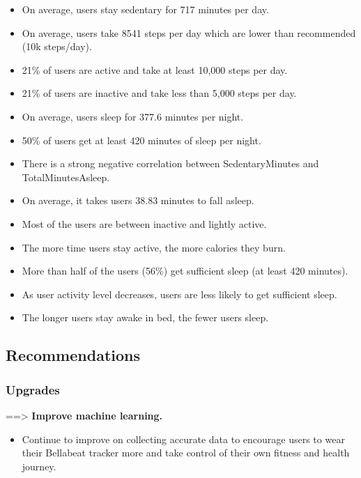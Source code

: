 \documentclass[
]{article}
\providecommand{\tightlist}{%
  \setlength{\itemsep}{0pt}\setlength{\parskip}{0pt}}
\begin{document}
\begin{itemize}
\tightlist
\item
  On average, users stay sedentary for 717 minutes per day.
\item
  On average, users take 8541 steps per day which are lower than
  recommended (10k steps/day).
\item
  21\% of users are active and take at least 10,000 steps per day.
\item
  21\% of users are inactive and take less than 5,000 steps per day.
\item
  On average, users sleep for 377.6 minutes per night.
\item
  50\% of users get at least 420 minutes of sleep per night.
\item
  There is a strong negative correlation between SedentaryMinutes and
  TotalMinutesAsleep.
\item
  On average, it takes users 38.83 minutes to fall asleep.
\item
  Most of the users are between inactive and lightly active.
\item
  The more time users stay active, the more calories they burn.
\item
  More than half of the users (56\%) get sufficient sleep (at least 420
  minutes).
\item
  As user activity level decreases, users are less likely to get
  sufficient sleep.
\item
  The longer users stay awake in bed, the fewer users sleep.
\end{itemize}

\hypertarget{recommendations}{%
\subsection{Recommendations}\label{recommendations}}

\hypertarget{upgrades}{%
\subsubsection{Upgrades}\label{upgrades}}

==\textgreater{} \textbf{Improve machine learning.}

\begin{itemize}
\tightlist
\item
  Continue to improve on collecting accurate data to encourage users to
  wear their Bellabeat tracker more and take control of their own
  fitness and health journey.
\end{itemize}
\end{document}
